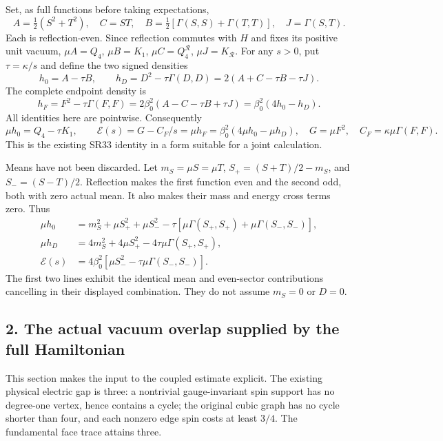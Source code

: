 \documentclass[11pt]{article}
\begin{document}
Set, as full functions before taking expectations,
\[
 A=\tfrac12(S^2+T^2),\quad C=ST,\quad
 B=\tfrac12[\Gamma(S,S)+\Gamma(T,T)],\quad J=\Gamma(S,T).
 \tag{AC6}
\]
Each is reflection-even. Since reflection commutes with \(H\) and fixes its positive unit vacuum, \(\mu A=Q_4\), \(\mu B=K_1\), \(\mu C=Q_4^{\mathcal R}\), \(\mu J=K_{\mathcal R}\). For any \(s>0\), put \(\tau=\kappa/s\) and define the two signed densities
\[
 h_0=A-\tau B,\qquad
 h_D=D^2-\tau\Gamma(D,D)
       =2(A+C-\tau B-\tau J).
 \tag{AC7}
\]
The complete endpoint density is
\[
 h_F=F^2-\tau\Gamma(F,F)
     =2\beta_0^2(A-C-\tau B+\tau J)
     =\beta_0^2(4h_0-h_D).
 \tag{AC8}
\]
All identities here are pointwise. Consequently
\[
 \mu h_0=Q_4-\tau K_1,\qquad
 \mathcal E(s)=G-C_F/s=\mu h_F
   =\beta_0^2(4\mu h_0-\mu h_D),\quad
 G=\mu F^2,\quad C_F=\kappa\mu\Gamma(F,F).
 \tag{AC9}
\]
This is the existing SR33 identity in a form suitable for a joint calculation.

Means have not been discarded. Let \(m_S=\mu S=\mu T\), \(S_+=(S+T)/2-m_S\), and \(S_-=(S-T)/2\). Reflection makes the first function even and the second odd, both with zero actual mean. It also makes their mass and energy cross terms zero. Thus
\[
 \begin{aligned}
 \mu h_0&=m_S^2+\mu S_+^2+\mu S_-^2
                 -\tau[\mu\Gamma(S_+,S_+)+\mu\Gamma(S_-,S_-)],\\
 \mu h_D&=4m_S^2+4\mu S_+^2-4\tau\mu\Gamma(S_+,S_+),\\
 \mathcal E(s)&=4\beta_0^2[\mu S_-^2-\tau\mu\Gamma(S_-,S_-)] .
 \end{aligned}\tag{AC10}
\]
The first two lines exhibit the identical mean and even-sector contributions cancelling in their displayed combination. They do not assume \(m_S=0\) or \(D=0\).

\subsection*{2. The actual vacuum overlap supplied by the full Hamiltonian}

This section makes the input to the coupled estimate explicit. The existing physical electric gap is three: a nontrivial gauge-invariant spin support has no degree-one vertex, hence contains a cycle; the original cubic graph has no cycle shorter than four, and each nonzero edge spin costs at least \(3/4\). The fundamental face trace attains three.
\end{document}
